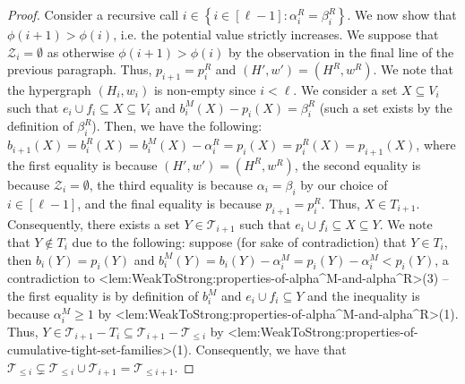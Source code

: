 \documentclass{article}
\def\Cref#1{<#1>}%
\newcommand{\zeros}{\ensuremath{\mathcal{Z}}\xspace}
\newcommand{\maximalTightSetFamily}[1]{\ensuremath{\calT_{#1}}\xspace}
\newcommand{\tightSetFamily}[1]{\ensuremath{T_{#1}}\xspace}
\newcommand{\cumulativeMaximalTightSetFamily}[1]{\ensuremath{\calT_{\leq #1}}}
\newcommand{\maximalTightSetContainingHyperedge}[1]{\ensuremath{\tau_{#1}}\xspace}
\providecommand{\calT}{\mathcal{T}}
\begin{document}
\begin{proof}
Consider a recursive call $i \in \left\{i \in [\ell - 1] : \alpha_i^R = \beta_i^R\right\}$. We now show that $\phi(i+1) > \phi(i)$, i.e. the potential value strictly increases. 
We suppose that $\zeros_i = \emptyset$ as otherwise $\phi(i+1) > \phi(i)$ by the observation in the final line of the previous paragraph.
Thus, $p_{i+1} = p_i^R$ and $(H', w') = (H^R, w^R)$. 
We note that the hypergraph $(H_i, w_i)$ is non-empty since $i < \ell$.
We consider a set $X\subseteq V_i$ such that $e_i\cup f_i\subseteq X\subseteq V_i$ and $b_i^M(X)-p_i(X)=\beta_i^R$ (such a set exists by the definition of $\beta_i^R$). 
Then, we have the following: $b_{i+1}(X) = b_i^R(X)=b_i^M(X)-\alpha_i^R=p_i(X)=p_i^R(X) = p_{i+1}(X)$, where the first equality is because $(H', w') = (H^R, w^R)$, the second equality is because $\zeros_i = \emptyset$, the third equality is because $\alpha_i = \beta_i$ by our choice of $i \in [\ell - 1]$, and the final equality is because $p_{i+1} = p_{i}^R$. Thus, $X \in \tightSetFamily{i+1}$. Consequently, 
there exists a set $Y \in \maximalTightSetFamily{i+1}$ such that $e_i\cup f_i \subseteq X \subseteq Y$. We note that $Y \not \in \tightSetFamily{i}$ due to the following: suppose (for sake of contradiction) that $Y \in \tightSetFamily{i}$, then 
$b_i(Y)=p_i(Y)$ and $b_i^M(Y)=b_i(Y)-\alpha_i^M=p_i(Y)-\alpha_i^M<p_i(Y)$, a contradiction to \Cref{lem:WeakToStrong:properties-of-alpha^M-and-alpha^R}(3) -- the first equality is by definition of $b_i^M$ and $e_i\cup f_i\subseteq Y$ and the inequality is because $\alpha_i^M\ge 1$ by \Cref{lem:WeakToStrong:properties-of-alpha^M-and-alpha^R}(1). Thus, $Y \in \maximalTightSetFamily{i+1} - \tightSetFamily{i} \subseteq \maximalTightSetFamily{i+1} - \cumulativeMaximalTightSetFamily{i}$ by \Cref{lem:WeakToStrong:properties-of-cumulative-tight-set-families}(1).
Consequently, we have that
$\cumulativeMaximalTightSetFamily{i} \subsetneq \cumulativeMaximalTightSetFamily{i} \cup \maximalTightSetFamily{i+1} = \cumulativeMaximalTightSetFamily{i+1}.$


\end{proof}
\end{document}
